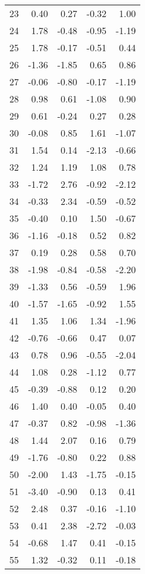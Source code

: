 \documentclass{article}\usepackage[]{graphicx}\usepackage[]{color}
\begin{document}
\begin{longtable}{rrrrr}
  23 & 0.40 & 0.27 & -0.32 & 1.00 \\ 
  24 & 1.78 & -0.48 & -0.95 & -1.19 \\ 
  25 & 1.78 & -0.17 & -0.51 & 0.44 \\ 
  26 & -1.36 & -1.85 & 0.65 & 0.86 \\ 
  27 & -0.06 & -0.80 & -0.17 & -1.19 \\ 
  28 & 0.98 & 0.61 & -1.08 & 0.90 \\ 
  29 & 0.61 & -0.24 & 0.27 & 0.28 \\ 
  30 & -0.08 & 0.85 & 1.61 & -1.07 \\ 
  31 & 1.54 & 0.14 & -2.13 & -0.66 \\ 
  32 & 1.24 & 1.19 & 1.08 & 0.78 \\ 
  33 & -1.72 & 2.76 & -0.92 & -2.12 \\ 
  34 & -0.33 & 2.34 & -0.59 & -0.52 \\ 
  35 & -0.40 & 0.10 & 1.50 & -0.67 \\ 
  36 & -1.16 & -0.18 & 0.52 & 0.82 \\ 
  37 & 0.19 & 0.28 & 0.58 & 0.70 \\ 
  38 & -1.98 & -0.84 & -0.58 & -2.20 \\ 
  39 & -1.33 & 0.56 & -0.59 & 1.96 \\ 
  40 & -1.57 & -1.65 & -0.92 & 1.55 \\ 
  41 & 1.35 & 1.06 & 1.34 & -1.96 \\ 
  42 & -0.76 & -0.66 & 0.47 & 0.07 \\ 
  43 & 0.78 & 0.96 & -0.55 & -2.04 \\ 
  44 & 1.08 & 0.28 & -1.12 & 0.77 \\ 
  45 & -0.39 & -0.88 & 0.12 & 0.20 \\ 
  46 & 1.40 & 0.40 & -0.05 & 0.40 \\ 
  47 & -0.37 & 0.82 & -0.98 & -1.36 \\ 
  48 & 1.44 & 2.07 & 0.16 & 0.79 \\ 
  49 & -1.76 & -0.80 & 0.22 & 0.88 \\ 
  50 & -2.00 & 1.43 & -1.75 & -0.15 \\ 
  51 & -3.40 & -0.90 & 0.13 & 0.41 \\ 
  52 & 2.48 & 0.37 & -0.16 & -1.10 \\ 
  53 & 0.41 & 2.38 & -2.72 & -0.03 \\ 
  54 & -0.68 & 1.47 & 0.41 & -0.15 \\ 
  55 & 1.32 & -0.32 & 0.11 & -0.18 \\ 

\end{longtable}
\end{document}
